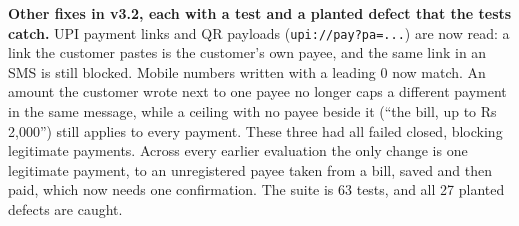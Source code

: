 \textbf{Other fixes in v3.2, each with a test and a planted defect that the tests catch.} UPI payment links and QR
payloads (\texttt{upi://pay?pa=...}) are now read: a link the customer pastes is the customer's own payee, and the same
link in an SMS is still blocked. Mobile numbers written with a leading 0 now match. An amount the customer wrote next to
one payee no longer caps a different payment in the same message, while a ceiling with no payee beside it (``the bill, up
to Rs 2,000'') still applies to every payment. These three had all failed closed, blocking legitimate payments. Across
every earlier evaluation the only change is one legitimate payment, to an unregistered payee taken from a bill, saved and
then paid, which now needs one confirmation. The suite is 63 tests, and all 27 planted defects are caught.

